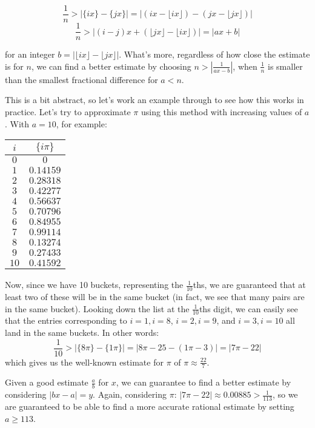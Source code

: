 \documentclass{article}
\begin{document}
\[ \frac{1}{n} > |\{ix\}-\{jx\}| = | (ix-\lfloor ix \rfloor) - (jx - \lfloor jx \rfloor) | \]
\[ \frac{1}{n} > | (i-j)x + (\lfloor jx \rfloor - \lfloor ix \rfloor ) | = | ax+b | \]

for an integer $b = |\lfloor ix \rfloor - \lfloor jx \rfloor|$. What's more, regardless of how close
the estimate is for $n$, we can find a better estimate by choosing $n > |\frac{1}{ax-b}|$, when
$\frac{1}{n}$ is smaller than the smallest fractional difference for $a<n$.

This is a bit abstract, so let's work an example through to see how this works in practice. Let's try
to approximate $\pi$ using this method with increasing values of $a$. With $a=10$, for example:

\begin{center}
	\begin{tabular}{|c|c|}
		\hline
		$i$ & $\{i\pi\}$ \\
		\hline
		$0$ & $0$ \\
		$1$ & $0.14159$ \\
		$2$ & $0.28318$ \\
		$3$ & $0.42277$ \\
		$4$ & $0.56637$ \\
		$5$ & $0.70796$ \\
		$6$ & $0.84955$ \\
		$7$ & $0.99114$ \\
		$8$ & $0.13274$ \\
		$9$ & $0.27433$ \\
		$10$ & $0.41592$ \\
		\hline
	\end{tabular}
\end{center}

Now, since we have 10 buckets, representing the $\frac{1}{10}$ths, we are guaranteed that at
least two of these will be in the same bucket (in fact, we see that many pairs are in the same
bucket). Looking down the list at the $\frac{1}{10}$ths digit, we can easily see that the
entries corresponding to $i=1, i=8$, $i=2, i=9$, and $i=3, i=10$ all land in the same buckets.
In other words:
\[ \frac{1}{10}> |\{8\pi\}-\{1\pi\}| = | 8\pi - 25 - (1\pi - 3)| = |7\pi -22| \]
which gives us the well-known estimate for $\pi$ of $\pi \approx \frac{22}{7}$. 

Given a good estimate $\frac{a}{b}$ for $x$, we can guarantee to find a better estimate by 
considering $|bx-a| = y$. Again, considering $\pi$: $|7\pi - 22| \approx 0.00885 > 
\frac{1}{113}$, so we are guaranteed to be able to find a more accurate rational estimate by setting
$a \geq 113$.
\end{document}
